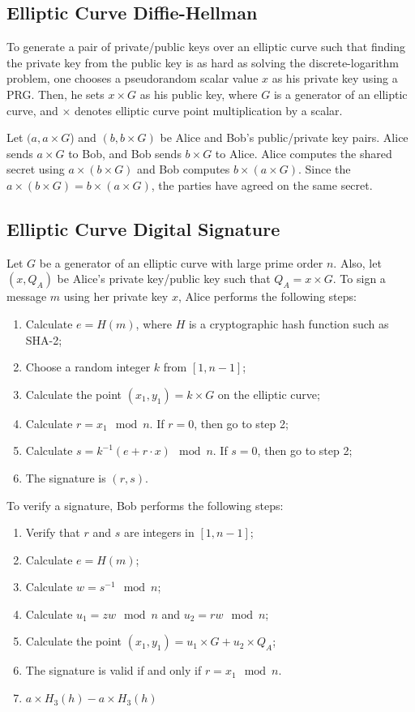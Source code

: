 \documentclass[11pt]{article}
\theoremstyle{plain}
\begin{document}
\subsection{Elliptic Curve Diffie-Hellman}

To generate a pair of private/public keys over an elliptic curve such
that finding the private key from the public key is as hard as solving
the discrete-logarithm problem, one chooses a pseudorandom scalar
value $x$ as his private key using a PRG. Then, he sets $x\times G$
as his public key, where $G$ is a generator of an elliptic curve,
and $\times$ denotes elliptic curve point multiplication by a scalar.

Let $(a,a\times G$) and $(b,b\times G)$ be Alice and Bob's public/private
key pairs. Alice sends $a\times G$ to Bob, and Bob sends $b\times G$
to Alice. Alice computes the shared secret using $a\times(b\times G)$
and Bob computes $b\times(a\times G)$. Since the $a\times(b\times G)=b\times(a\times G)$,
the parties have agreed on the same secret.

\subsection{Elliptic Curve Digital Signature}

Let $G$ be a generator of an elliptic curve with large prime order
$n$. Also, let $(x,Q_{A})$ be Alice's private key/public key such
that $Q_{A}=x\times G$. To sign a message $m$ using her private
key $x$, Alice performs the following steps:
\begin{enumerate}
	\item Calculate $e=H(m)$, where $H$ is a cryptographic hash function such
	as SHA-2;
	\item Choose a random integer $k$ from $[1,n-1]$;
	\item Calculate the point $(x_{1},y_{1})=k\times G$ on the elliptic curve;
	\item Calculate $r=x_{1}\mod n$. If $r=0$, then go to step 2;
	\item Calculate $s=k^{-1}(e+r\cdot x)\mod n$. If $s=0$, then go to step
	2;
	\item The signature is $(r,s)$.
\end{enumerate}
To verify a signature, Bob performs the following steps:
\begin{enumerate}
	\item Verify that $r$ and $s$ are integers in $[1,n-1]$;
	\item Calculate $e=H(m)$;
	\item Calculate $w=s^{-1}\mod n$;
	\item Calculate $u_{1}=zw\mod n$ and $u_{2}=rw\mod n$;
	\item Calculate the point $(x_{1},y_{1})=u_{1}\times G+u_{2}\times Q_{A}$;
	\item The signature is valid if and only if $r=x_{1}\mod n$.
	\item $a\times H_{3}(h)-a\times H_{3}(h)$
\end{enumerate}
\end{document}
